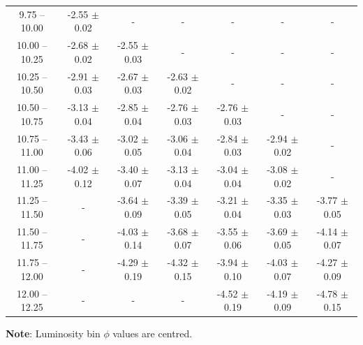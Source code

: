 \begin{table}
\begin{center}
\begin{tabular}{@{}ccccccc@{}}
        \hline
         9.75 -- 10.00 & -2.55 $\pm$ 0.02 & -                & -                & -                & -                & - \\
        10.00 -- 10.25 & -2.68 $\pm$ 0.02 & -2.55 $\pm$ 0.03 & -                & -                & -                & - \\
        10.25 -- 10.50 & -2.91 $\pm$ 0.03 & -2.67 $\pm$ 0.03 & -2.63 $\pm$ 0.02 & -                & -                & - \\
        10.50 -- 10.75 & -3.13 $\pm$ 0.04 & -2.85 $\pm$ 0.04 & -2.76 $\pm$ 0.03 & -2.76 $\pm$ 0.03 & -                & - \\
        10.75 -- 11.00 & -3.43 $\pm$ 0.06 & -3.02 $\pm$ 0.05 & -3.06 $\pm$ 0.04 & -2.84 $\pm$ 0.03 & -2.94 $\pm$ 0.02 & - \\
        11.00 -- 11.25 & -4.02 $\pm$ 0.12 & -3.40 $\pm$ 0.07 & -3.13 $\pm$ 0.04 & -3.04 $\pm$ 0.04 & -3.08 $\pm$ 0.02 & - \\
        11.25 -- 11.50 & -                & -3.64 $\pm$ 0.09 & -3.39 $\pm$ 0.05 & -3.21 $\pm$ 0.04 & -3.35 $\pm$ 0.03 & -3.77 $\pm$ 0.05 \\
        11.50 -- 11.75 & -                & -4.03 $\pm$ 0.14 & -3.68 $\pm$ 0.07 & -3.55 $\pm$ 0.06 & -3.69 $\pm$ 0.05 & -4.14 $\pm$ 0.07 \\
        11.75 -- 12.00 & -                & -4.29 $\pm$ 0.19 & -4.32 $\pm$ 0.15 & -3.94 $\pm$ 0.10 & -4.03 $\pm$ 0.07 & -4.27 $\pm$ 0.09 \\
        12.00 -- 12.25 & -                & -                & -                & -4.52 $\pm$ 0.19 & -4.19 $\pm$ 0.09 & -4.78 $\pm$ 0.15
        \botrule
    \end{tabular}
    \end{center}
    \begin{tabnote}
        {\textbf{Note}: Luminosity bin $\phi$ values are centred.}\tnp
    \end{tabnote}
\end{table}


